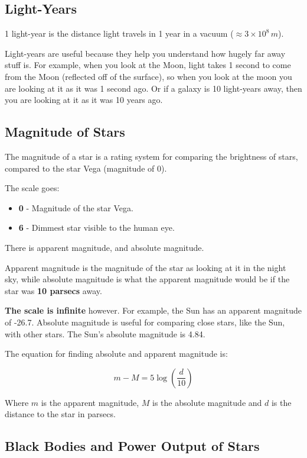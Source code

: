 \documentclass[a4paper, 12pt]{article}
\begin{document}
\subsection{Light-Years}

1 light-year is the distance light travels in 1 year in a vacuum ($\approx 3 \times 10^8 \, m$).

Light-years are useful because they help you understand how hugely far away stuff is. For example, when you look at the Moon, light takes 1 second to come from the Moon (reflected off of the surface), so when you look at the moon you are looking at it as it was 1 second ago. Or if a galaxy is 10 light-years away, then you are looking at it as it was 10 years ago.

\subsection{Magnitude of Stars}

The magnitude of a star is a rating system for comparing the brightness of stars, compared to the star Vega (magnitude of 0).

The scale goes:

\begin{itemize}
	\item \textbf{0} - Magnitude of the star Vega.
	\item \textbf{6} - Dimmest star visible to the human eye.
\end{itemize}

There is apparent magnitude, and absolute magnitude.

Apparent magnitude is the magnitude of the star as looking at it in the night sky, while absolute magnitude is what the apparent magnitude would be if the star was \textbf{10 parsecs} away.

\textbf{The scale is infinite} however. For example, the Sun has an apparent magnitude of -26.7. Absolute magnitude is useful for comparing close stars, like the Sun, with other stars. The Sun's absolute magnitude is 4.84.

The equation for finding absolute and apparent magnitude is:

$$
m - M = 5 \log \left({\frac{d}{10}}\right)
$$

Where $m$ is the apparent magnitude, $M$ is the absolute magnitude and $d$ is the distance to the star in parsecs.



\subsection{Black Bodies and Power Output of Stars}
\end{document}
